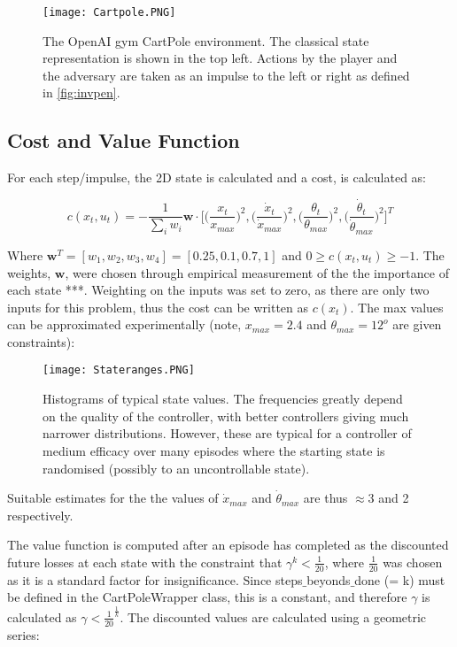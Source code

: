 \documentclass[../main.tex]{subfiles}
\begin{document}
\begin{figure}[H]
   \centering
   \texttt{[image: Cartpole.PNG]}
   \caption{\label{fig:openai} The OpenAI gym CartPole environment. The classical state representation is shown in the top left. Actions by the player and the adversary are taken as an impulse to the left or right as defined in \cref{fig:invpen}.}
\end{figure}

\subsection{Cost and Value Function}

For each step/impulse, the 2D state is calculated and a cost, is calculated as:

\begin{equation}
   c(x_t, u_t) = - \frac{1}{\sum_{i} w_i} \boldsymbol{w} \cdot \bigg[ \Big(\frac{x_t}{x_{max}}\Big)^2,  \Big(\frac{\dot{x}_t}{\dot{x}_{max}}\Big)^2,  \Big(\frac{\theta_t}{\theta_{max}}\Big)^2,  \Big(\frac{\dot{\theta}_t}{\dot{\theta}_{max}}\Big)^2 \bigg]^T
\end{equation}

Where $\boldsymbol{w}^T = [w_1, w_2, w_3, w_4] = [0.25, 0.1, 0.7, 1]$ and $0 \geq c(x_t, u_t) \geq -1$. The weights, $\boldsymbol{w}$, were chosen through empirical measurement of the the importance of each state ***. Weighting on the inputs was set to zero, as there are only two inputs for this problem, thus the cost can be written as $c(x_t)$. The max values can be approximated experimentally (note, $x_{max} = 2.4$ and $\theta_{max} = 12^o$ are given constraints):

\begin{figure}[H]
   \centering
   \texttt{[image: Stateranges.PNG]}
   \caption{\label{fig:ranges} Histograms of typical state values. The frequencies greatly depend on the quality of the controller, with better controllers giving much narrower distributions. However, these are typical for a controller of medium efficacy over many episodes where the starting state is randomised (possibly to an uncontrollable state).}
\end{figure}

Suitable estimates for the the values of $\dot{x}_{max}$ and $\dot{\theta}_{max}$ are thus $\approx 3$ and 2 respectively.

The value function is computed after an episode has completed as the discounted future losses at each state with the constraint that $\gamma^{k} < \frac{1}{20}$, where $\frac{1}{20}$ was chosen as it is a standard factor for insignificance. Since steps$\_$beyonds$\_$done (= k) must be defined in the CartPoleWrapper class, this is a constant, and therefore $\gamma$ is calculated as $\gamma < \frac{1}{20}^{\frac{1}{k}}$. The discounted values are calculated using a geometric series:
\end{document}

